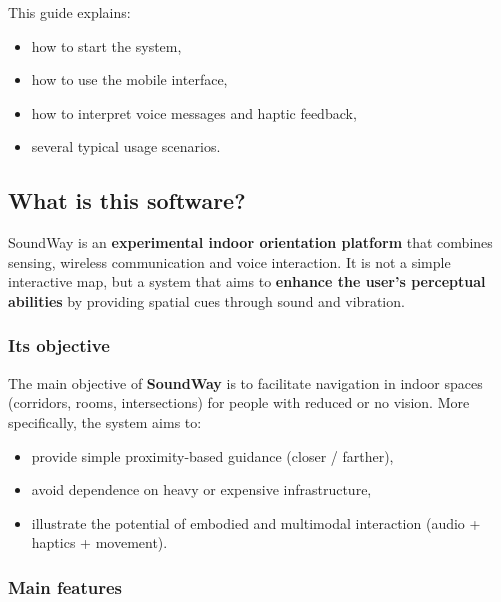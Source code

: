 \documentclass[12pt,a4paper]{article}
\begin{document}
This guide explains:
\begin{itemize}
    \item how to start the system,
    \item how to use the mobile interface,
    \item how to interpret voice messages and haptic feedback,
    \item several typical usage scenarios.
\end{itemize}

\subsection{What is this software?}

SoundWay is an \textbf{experimental indoor orientation platform} that combines sensing, wireless communication and voice interaction.  
It is not a simple interactive map, but a system that aims to \textbf{enhance the user’s perceptual abilities} by providing spatial cues through sound and vibration.

\subsubsection{Its objective}

The main objective of \textbf{SoundWay} is to facilitate navigation in indoor spaces (corridors, rooms, intersections) for people with reduced or no vision. More specifically, the system aims to:
\begin{itemize}
    \item provide simple proximity-based guidance (closer / farther),
    \item avoid dependence on heavy or expensive infrastructure,
    \item illustrate the potential of embodied and multimodal interaction (audio + haptics + movement).
\end{itemize}

\subsubsection{Main features}
\end{document}
